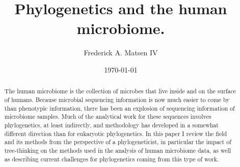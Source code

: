 \documentclass{amsart}
\newcommand{\forarxiv}[1]{#1}
\newcommand{\notforarxiv}[1]{}
\begin{document}
\notforarxiv{
\begin{flushright}
Version dated: \today
\end{flushright}
\bigskip
\noindent RH: PHYLOGENETICS AND THE HUMAN MICROBIOME
\bigskip
\medskip
\begin{center}

\noindent{\Large \bf Phylogenetics and the human microbiome.}
\bigskip

\noindent {\normalsize \sc
Frederick A. Matsen IV$^1$}\\
\noindent {\small \it
$^1$
Program in Computational Biology, Fred Hutchinson Cancer Research Center, Seattle, WA, 91802, USA}\\
\end{center}
\medskip
\noindent{\bf Corresponding author:} Frederick A Matsen, Program in Computational Biology, Fred Hutchinson Cancer Research Center, Seattle, WA, 91802, USA; E-mail: matsen@fhcrc.org.\\
\vspace{1in}
}

\forarxiv{\
\title{Phylogenetics and the human microbiome.}
\author{Frederick A. Matsen IV}
\date{\today}
\begin{abstract}
}
\notforarxiv{
\subsubsection{Abstract}
}

The human microbiome is the collection of microbes that live inside and on the surface of humans.
Because microbial sequencing information is now much easier to come by than phenotypic information, there has been an explosion of sequencing information of microbiome samples.
Much of the analytical work for these sequences involves phylogenetics, at least indirectly, and methodology has developed in a somewhat different direction than for eukaryotic phylogenetics.
In this paper I review the field and its methods from the perspective of a phylogeneticist, in particular the impact of tree-thinking on the methods used in the analysis of human microbiome data, as well as describing current challenges for phylogenetics coming from this type of work.

\forarxiv{
\end{abstract}
\maketitle
}

\notforarxiv{
\noindent (Keywords: human microbiome; microbial ecology; phylogenetic methods; review)\\
\vspace{1.5in}
}
\end{document}
